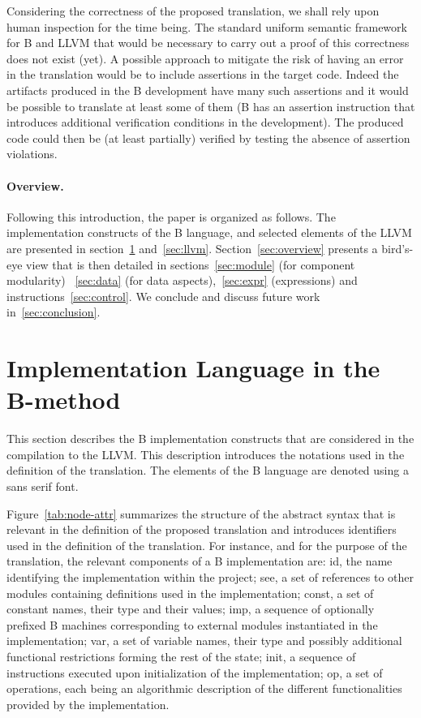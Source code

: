 \documentclass{llncs}
\newcommand{\B}[1]{\textsf{#1}}
\begin{document}
Considering the correctness of the proposed translation, we shall rely upon
human inspection for the time being. The standard uniform semantic framework for
B and LLVM that would be necessary to carry out a proof of this correctness does
not exist (yet). A possible approach to mitigate the risk of having an error in
the translation would be to include assertions in the target code. Indeed the
artifacts produced in the B development have many such assertions and it would
be possible to translate at least some of them (B has an assertion instruction
that introduces additional verification conditions in the development). The
produced code could then be (at least partially) verified by testing the absence
of assertion violations.

\paragraph{Overview.} Following this introduction, the paper is organized as
follows. The implementation constructs of the B language, and selected elements
of the LLVM are presented in section~\ref{sec:b-impl}
and~\ref{sec:llvm}. Section~\ref{sec:overview} presents a bird's-eye view that
is then detailed in sections~\ref{sec:module} (for component modularity)
~\ref{sec:data} (for data aspects),~\ref{sec:expr} (expressions) and
instructions~\ref{sec:control}. We conclude and discuss future work
in~\ref{sec:conclusion}.

\section{Implementation Language in the B-method}
\label{sec:b-impl}

This section describes the B implementation constructs that are considered in
the compilation to the LLVM. This description introduces the notations used in
the definition of the translation. The elements of the B language are denoted
using a \B{sans serif} font. 

Figure~\ref{tab:node-attr} summarizes the structure
of the abstract syntax that is relevant in the definition of the proposed
translation and introduces identifiers used in the definition of the
translation. For instance, and for the purpose of the translation, the relevant
components of a B implementation are: \B{id}, the name identifying the
implementation within the project; \B{see}, a set of references to other modules
containing definitions used in the implementation; \B{const}, a set of constant
names, their type and their values; \B{imp}, a sequence of optionally
prefixed B machines corresponding to external modules instantiated in the
implementation; \B{var}, a set of variable names, their type and possibly
additional functional restrictions forming the rest of the state; \B{init}, a
sequence of instructions executed upon initialization of the implementation;
\B{op}, a set of operations, each being an algorithmic description of the
different functionalities provided by the implementation.
\end{document}
